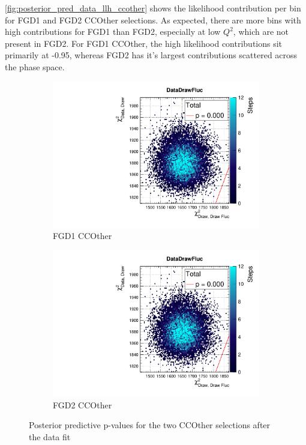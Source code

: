 \autoref{fig:posterior_pred_data_llh_ccother} shows the likelihood contribution per bin for FGD1 and FGD2 CCOther selections. As expected, there are more bins with high contributions for FGD1 than FGD2, especially at low $Q^2$, which are not present in FGD2. For FGD1 CCOther, the high likelihood contributions sit primarily at -0.95, whereas FGD2 has it's largest contributions scattered across the phase space.
\begin{figure}[h]
	\begin{subfigure}[t]{0.49\textwidth}
		\includegraphics[width=\textwidth, trim={0mm 6mm 0mm 11mm}, clip,page=21]{figures/mach3/data/postpred/2017b_NewData_NewDet_UpdXsecStep_2Xsec_4Det_5Flux_0_PostPred_procs}
		\caption{FGD1 CCOther}
	\end{subfigure}
	\begin{subfigure}[t]{0.49\textwidth}
		\includegraphics[width=\textwidth, trim={0mm 6mm 0mm 11mm}, clip,page=48]{figures/mach3/data/postpred/2017b_NewData_NewDet_UpdXsecStep_2Xsec_4Det_5Flux_0_PostPred_procs}
		\caption{FGD2 CCOther}
	\end{subfigure}
\caption{Posterior predictive p-values for the two CCOther selections after the data fit}
\label{fig:posterior_pred_data_llh_ccother}
\end{figure}

